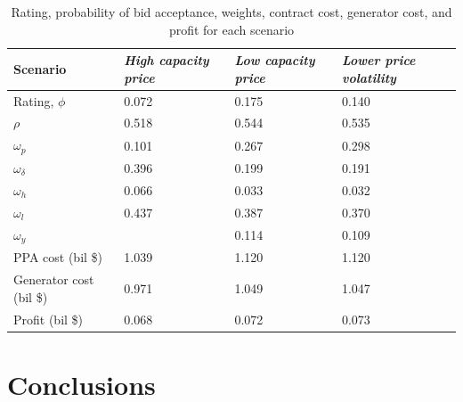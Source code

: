 \documentclass[informs]{informs3}
\begin{document}
\begin{table}%
\caption {Rating, probability of bid acceptance, weights, contract cost, generator cost, and profit for each scenario} \label{tableResults}
\begin{tabular}{@{}llll@{}}
\toprule
Scenario                & \textit{High capacity price} & \textit{Low capacity price} & \textit{Lower price volatility} \\ \midrule
Rating, $\phi$          & 0.072                          & 0.175                         & 0.140                             \\
$\rho$                  & 0.518                          & 0.544                         & 0.535                             \\
$\omega_p$              & 0.101                          & 0.267                         & 0.298                             \\
$\omega_{\delta}$       & 0.396                          & 0.199                         & 0.191                             \\
$\omega_h$              & 0.066                          & 0.033                         & 0.032                             \\
$\omega_l$              & 0.437                          & 0.387                         & 0.370                             \\
$\omega_y$              &                                & 0.114                         & 0.109                             \\
PPA cost (bil \$)       & 1.039                          & 1.120                         & 1.120                             \\
Generator cost (bil \$) & 0.971                          & 1.049                         & 1.047                             \\
Profit (bil \$)         & 0.068                          & 0.072                         & 0.073                             \\ \bottomrule
\end{tabular}
\end{table}




\section{Conclusions}\label{Conclusions}


\end{document}
